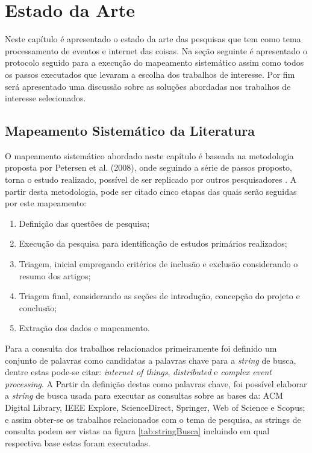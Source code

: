 \documentclass[tid,table]{texufpel} %
\begin{document}

\chapter{Estado da Arte} 
\label{cap:Estado_da_Arte}

Neste capítulo é apresentado o estado da arte das pesquisas que tem como tema processamento de eventos e internet das coisas. Na seção seguinte é apresentado o protocolo seguido para a execução do mapeamento sistemático assim como todos os passos executados que levaram a escolha dos trabalhos de interesse. Por fim será apresentado uma discussão sobre as soluções abordadas nos trabalhos de interesse selecionados.    

\section{Mapeamento Sistemático da Literatura}

O mapeamento sistemático abordado neste capítulo é baseada na metodologia proposta por Petersen et al. (2008), onde seguindo a série de passos proposto, torna o estudo realizado, possível de ser replicado por outros pesquisadores \cite{petersen08}. A partir desta metodologia, pode ser citado cinco etapas das quais serão seguidas por este mapeamento:

\begin{enumerate}
	\item Definição das questões de pesquisa;
	\item Execução da pesquisa para identificação de estudos primários realizados;
	\item Triagem, inicial empregando critérios de inclusão e exclusão considerando o resumo dos artigos;
	\item Triagem final, considerando as seções de introdução, concepção do projeto e conclusão;
	\item Extração dos dados e mapeamento.
	

\end{enumerate}  

Para a consulta dos trabalhos relacionados primeiramente foi definido um conjunto de palavras como candidatas a palavras chave para a \textit{string} de busca, dentre estas pode-se citar: \textit{internet of things}, \textit{distributed} e \textit{complex event processing}. A Partir da definição destas como palavras chave, foi possível elaborar a \textit{string} de busca usada para executar as consultas sobre as bases da: ACM Digital Library, IEEE Explore, ScienceDirect, Springer, Web of Science e Scopus; e assim obter-se os trabalhos relacionados com o tema de pesquisa, as strings de consulta podem ser vistas na figura \ref{tab:stringBusca} incluindo em qual respectiva base estas foram executadas.
\end{document}
